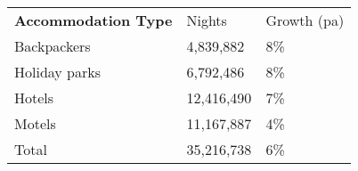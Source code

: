 \begin{tabular}[t]{p{4.8cm}>{\hfill}p{1.3cm}>{\hfill}p{1.4cm}}
 \textbf{Accommodation Type} & Nights & Growth (pa) \\ 
 Backpackers &  4,839,882 & 8\% \\ 
  Holiday parks &  6,792,486 & 8\% \\ 
  Hotels & 12,416,490 & 7\% \\ 
  Motels & 11,167,887 & 4\% \\ 
  Total & 35,216,738 & 6\% \\ 
  \end{tabular}
